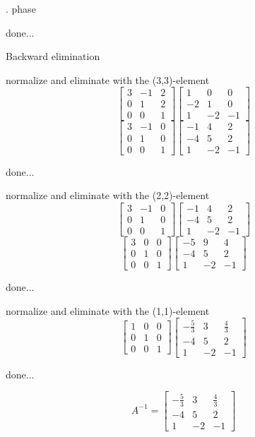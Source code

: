 \documentclass[12pt]{article}
\begin{document}
\par{}. phase

\par\noindent done...


\par\noindent Backward elimination


normalize and eliminate with the (3,3)-element
$$\left[{\begin{array}{ccc}3& -1& 2\\ 0& 1& 2\\ 0& 0& 1\end{array}}\right]\left[{\begin{array}{ccc}1& 0& 0\\ -2& 1& 0\\ 1& -2& -1\end{array}}\right]$$
$$\left[{\begin{array}{ccc}3& -1& 0\\ 0& 1& 0\\ 0& 0& 1\end{array}}\right]\left[{\begin{array}{ccc}-1& 4& 2\\ -4& 5& 2\\ 1& -2& -1\end{array}}\right]$$
\par\noindent done...


normalize and eliminate with the (2,2)-element
$$\left[{\begin{array}{ccc}3& -1& 0\\ 0& 1& 0\\ 0& 0& 1\end{array}}\right]\left[{\begin{array}{ccc}-1& 4& 2\\ -4& 5& 2\\ 1& -2& -1\end{array}}\right]$$
$$\left[{\begin{array}{ccc}3& 0& 0\\ 0& 1& 0\\ 0& 0& 1\end{array}}\right]\left[{\begin{array}{ccc}-5& 9& 4\\ -4& 5& 2\\ 1& -2& -1\end{array}}\right]$$
\par\noindent done...


normalize and eliminate with the (1,1)-element
$$\left[{\begin{array}{ccc}1& 0& 0\\ 0& 1& 0\\ 0& 0& 1\end{array}}\right]\left[{\begin{array}{ccc}-\frac{5}{3}& 3& \frac{4}{3}\\ -4& 5& 2\\ 1& -2& -1\end{array}}\right]$$
\par\noindent done...


$$ A^{-1}=\left[{\begin{array}{ccc}-\frac{5}{3}& 3& \frac{4}{3}\\ -4& 5& 2\\ 1& -2& -1\end{array}}\right]$$
\end{document}

